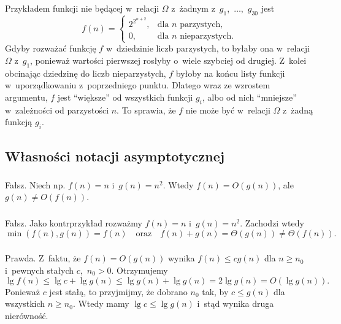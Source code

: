 \subsubsection{} %
Przykładem funkcji nie będącej w~relacji $\Omega$ z~żadnym z~$g_1$,~$\dots$,~$g_{30}$ jest
\[
	f(n) =
	\begin{cases}
		2^{2^{n+2}}, & \text{dla $n$ parzystych,} \\
		0, & \text{dla $n$ nieparzystych}.
	\end{cases}
\]
Gdyby rozważać funkcję $f$ w~dziedzinie liczb parzystych, to byłaby ona w~relacji $\Omega$ z~$g_1$, ponieważ wartości pierwszej rosłyby o~wiele szybciej od drugiej. Z~kolei obcinając dziedzinę do liczb nieparzystych, $f$ byłoby na końcu listy funkcji w~uporządkowaniu z~poprzedniego punktu. Dlatego wraz ze wzrostem argumentu, $f$ jest ``większe'' od wszystkich funkcji $g_i$, albo od nich ``mniejsze'' w~zależności od parzystości $n$. To sprawia, że $f$ nie może być w~relacji $\Omega$ z~żadną funkcją $g_i$.

\subsection{Własności notacji asymptotycznej} %

\subsubsection{} %
Fałsz. Niech np. $f(n)=n$ i~$g(n)=n^2$. Wtedy $f(n)=O(g(n))$, ale $g(n)\ne O(f(n))$.

\subsubsection{} %
Fałsz. Jako kontrprzykład rozważmy $f(n)=n$ i~$g(n)=n^2$. Zachodzi wtedy
\[
	\min(f(n),g(n)) = f(n) \quad\text{oraz}\quad f(n)+g(n) = \Theta(g(n)) \ne \Theta(f(n)).
\]

\subsubsection{} %
Prawda. Z~faktu, że $f(n)=O(g(n))$ wynika $f(n)\le cg(n)$ dla $n\ge n_0$ i~pewnych stałych $c$,~$n_0>0$. Otrzymujemy
\[
	\lg f(n) \le \lg c+\lg g(n) \le \lg g(n)+\lg g(n) = 2\lg g(n) = O(\lg g(n)).
\]
Ponieważ $c$ jest stałą, to przyjmijmy, że dobrano $n_0$ tak, by $c\le g(n)$ dla wszystkich $n\ge n_0$. Wtedy mamy $\lg c\le\lg g(n)$ i~stąd wynika druga nierówność.

